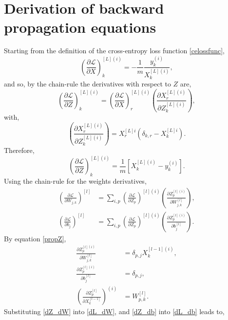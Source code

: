 \documentclass[nohyperref]{article}
\theoremstyle{plain}
\theoremstyle{definition}
\theoremstyle{remark}
\begin{document}
\section{Derivation of backward propagation equations}\label{backprop_derive}
Starting from the definition of the cross-entropy loss function \ref{celossfunc}, 
\begin{equation}
\left(\frac{\partial \mathcal{L}}{\partial X}\right)^{[L](i)}_k=-\frac{1}{m}\frac{y^{(i)}_k}{X^{[L](i)}_k},\nonumber
\end{equation}
and so, by the chain-rule the derivatives with respect to $Z$ are,
\begin{equation}
\left(\frac{\partial \mathcal{L}}{\partial Z}\right)^{[L](i)}_k=\left(\frac{\partial \mathcal{L}}{\partial X}\right)^{[L](i)}_r \left(\frac{\partial X^{[L](i)}_r}{\partial Z^{[L](i)}_k}\right),\nonumber
\end{equation}
with,
\begin{equation}
\left(\frac{\partial X^{[L](i)}_r}{\partial Z^{[L](i)}_k}\right)=X_{r}^{[L]i}(\delta_{k,r} - X_{k}^{[L]i}).\nonumber
\end{equation}
Therefore,
\begin{equation}
\left(\frac{\partial \mathcal{L}}{\partial Z}\right)^{[L](i)}_k=\frac{1}{m}\left[X^{[L](i)}_k-y^{(i)}_k\right].\nonumber
\end{equation}
Using the chain-rule for the weights derivatives,
\begin{align}
\left(\frac{\partial \mathcal{L}}{\partial W_{j,k}}\right)^{[l]}&=\sum_{i,p}\left(\frac{\partial \mathcal{L}}{\partial Z_{p}}\right)^{[l](i)}\left(\frac{\partial Z_{p}^{[l](i)}}{\partial W_{j,k}^{[l]}}\right),\label{dL_dW}\\
\left(\frac{\partial \mathcal{L}}{\partial b_{j}}\right)^{[l]}&=\sum_{i,p}\left(\frac{\partial \mathcal{L}}{\partial Z_{p}}\right)^{[l](i)}\left(\frac{\partial Z_{p}^{[l](i)}}{\partial b_{j}^{[l]}}\right).\label{dL_db}
\end{align}
By equation \ref{propZ},
\begin{align}
\frac{\partial Z_{p}^{[l](i)}}{\partial W_{j,k}^{[l]}}&=\delta_{p,j}X_{k}^{[l-1](i)},\label{dZ_dW}\\
\frac{\partial Z_{p}^{[l](i)}}{\partial b_{j}^{[l]}}&=\delta_{p,j},\label{dZ_db}\\
\left(\frac{\partial Z_{p}^{[l]}}{\partial X_{k}^{[l-1]}}\right)^{(i)}&=W_{p,k}^{[l]}.\label{dZ_dX}
\end{align}
Substituting \ref{dZ_dW} into \ref{dL_dW}, and \ref{dZ_db} into \ref{dL_db} leads to,
\end{document}

